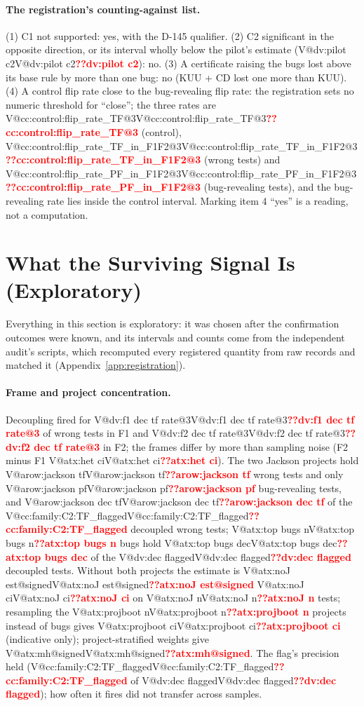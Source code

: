 \documentclass[pdflatex,iicol,sn-mathphys-num]{sn-jnl}
\makeatletter
\newcommand{\V}[1]{\ifcsname V@#1\endcsname\csname V@#1\endcsname\else\textbf{\textcolor{red}{??#1}}\fi}
\makeatother
\begin{document}
\paragraph{The registration's counting-against list.} (1) C1 not supported: yes, with the D-145 qualifier. (2) C2 significant in the opposite direction, or its interval wholly below the pilot's estimate (\V{dv:pilot c2}): no. (3) A certificate raising the bugs lost above its base rule by more than one bug: no (KUU + CD lost one more than KUU). (4) A control flip rate close to the bug-revealing flip rate: the registration sets no numeric threshold for ``close''; the three rates are \V{cc:control:flip_rate_TF@3} (control), \V{cc:control:flip_rate_TF_in_F1F2@3} (wrong tests) and \V{cc:control:flip_rate_PF_in_F1F2@3} (bug-revealing tests), and the bug-revealing rate lies inside the control interval. Marking item 4 ``yes'' is a reading, not a computation.

\section{What the Surviving Signal Is (Exploratory)}\label{sec:surviving}

Everything in this section is exploratory: it was chosen after the confirmation outcomes were known, and its intervals and counts come from the independent audit's scripts, which recomputed every registered quantity from raw records and matched it (Appendix~\ref{app:registration}).

\paragraph{Frame and project concentration.} Decoupling fired for \V{dv:f1 dec tf rate@3} of wrong tests in F1 and \V{dv:f2 dec tf rate@3} in F2; the frames differ by more than sampling noise (F2 minus F1 \V{atx:het ci}). The two Jackson projects hold \V{arow:jackson tf} wrong tests and only \V{arow:jackson pf} bug-revealing tests, and \V{arow:jackson dec tf} of the \V{cc:family:C2:TF_flagged} decoupled wrong tests; \V{atx:top bugs n} bugs hold \V{atx:top bugs dec} of the \V{dv:dec flagged} decoupled tests. Without both projects the estimate is \V{atx:noJ est@signed} \V{atx:noJ ci} on \V{atx:noJ n} tests; resampling the \V{atx:projboot n} projects instead of bugs gives \V{atx:projboot ci} (indicative only); project-stratified weights give \V{atx:mh@signed}. The flag's precision held (\V{cc:family:C2:TF_flagged} of \V{dv:dec flagged}); how often it fires did not transfer across samples.
\end{document}
